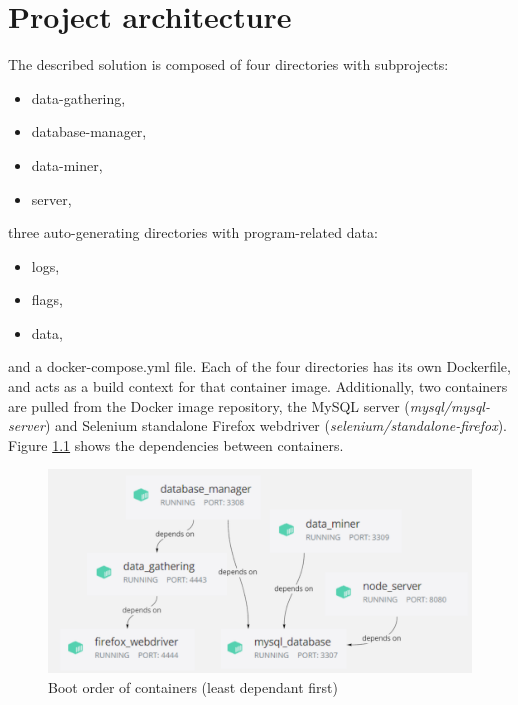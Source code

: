 \chapter{Project architecture}
\label{ch:architecture}
The described solution is composed of four directories with subprojects:
\begin{itemize}
    \setlength\itemsep{0.2em}
    \item data-gathering,
    \item database-manager,
    \item data-miner,
    \item server,
\end{itemize}
three auto-generating directories with program-related data:
\begin{itemize}
    \setlength\itemsep{0.2em}
    \item logs,
    \item flags,
    \item data,
\end{itemize}
and a docker-compose.yml file. Each of the four directories has its own Dockerfile, and acts as a build context for that container image. Additionally, two containers are pulled from the Docker image repository, the MySQL server (\textit{mysql/mysql-server}) and Selenium standalone Firefox webdriver (\textit{selenium/standalone-firefox}).
Figure \ref{arch:container_dependencies} shows the dependencies between containers.

\begin{figure}[ht]
    \centering
    \includegraphics[width=\textwidth]{figures/container_dependencies.png}
    \caption{Boot order of containers (least dependant first)}
    \label{arch:container_dependencies}
\end{figure}

